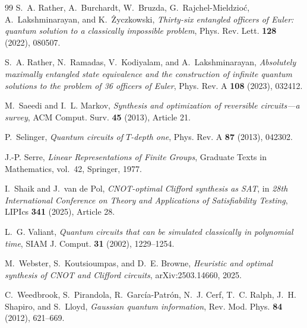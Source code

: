 \begin{thebibliography}{99}
S.~A. Rather, A.~Burchardt, W.~Bruzda, G.~Rajchel-Mieldzio\'c, A.~Lakshminarayan, and K.~\.Zyczkowski,
\emph{Thirty-six entangled officers of Euler: quantum solution to a classically impossible problem},
Phys. Rev. Lett. \textbf{128} (2022), 080507.

S.~A. Rather, N.~Ramadas, V.~Kodiyalam, and A.~Lakshminarayan,
\emph{Absolutely maximally entangled state equivalence and the construction of infinite quantum solutions to the problem of 36 officers of Euler},
Phys. Rev. A \textbf{108} (2023), 032412.

M.~Saeedi and I.~L. Markov,
\emph{Synthesis and optimization of reversible circuits---a survey},
ACM Comput. Surv. \textbf{45} (2013), Article 21.

P.~Selinger,
\emph{Quantum circuits of $T$-depth one},
Phys. Rev. A \textbf{87} (2013), 042302.

J.-P. Serre,
\emph{Linear Representations of Finite Groups},
Graduate Texts in Mathematics, vol.~42, Springer, 1977.

I.~Shaik and J.~van de Pol,
\emph{CNOT-optimal Clifford synthesis as SAT},
in \emph{28th International Conference on Theory and Applications of Satisfiability Testing},
LIPIcs \textbf{341} (2025), Article 28.

L.~G. Valiant,
\emph{Quantum circuits that can be simulated classically in polynomial time},
SIAM J. Comput. \textbf{31} (2002), 1229--1254.

M.~Webster, S.~Koutsioumpas, and D.~E. Browne,
\emph{Heuristic and optimal synthesis of CNOT and Clifford circuits},
arXiv:2503.14660, 2025.

C.~Weedbrook, S.~Pirandola, R.~Garc\'ia-Patr\'on, N.~J. Cerf, T.~C. Ralph, J.~H. Shapiro, and S.~Lloyd,
\emph{Gaussian quantum information},
Rev. Mod. Phys. \textbf{84} (2012), 621--669.

\end{thebibliography}
